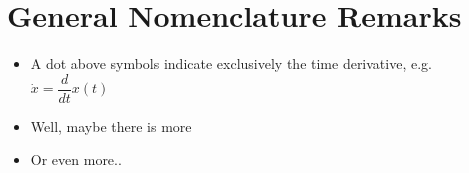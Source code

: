 \section*{General Nomenclature Remarks}
\vspace{0.1cm}
\begin{itemize}
\item A dot above symbols indicate exclusively the time derivative, e.g. $\dot{x} = \dfrac{d}{dt}x(t)$
\item Well, maybe there is more
\item Or even more..
\end{itemize}
